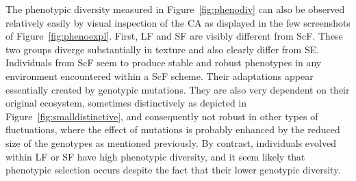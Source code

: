 The phenotypic diversity measured in Figure~\ref{fig:phenodiv} can also be observed relatively easily by visual inspection of the CA as displayed in the few screenshots of Figure~\ref{fig:phenoexpl}. First, LF and SF are visibly different from ScF. These two groups diverge substantially in texture and also clearly differ from SE. Individuals from ScF seem to produce stable and robust phenotypes in any environment encountered within a ScF scheme. Their adaptations appear essentially created by genotypic mutations. They are also very dependent on their original ecosystem, sometimes distinctively as depicted in Figure~\ref{fig:smalldistinctive}, and consequently not robust in other types of fluctuations, where the effect of mutations is probably enhanced by the reduced size of the genotypes as mentioned previously. By contrast, individuals evolved within LF or SF have high phenotypic diversity, and it seem likely that phenotypic selection occurs despite the fact that their lower genotypic diversity.

